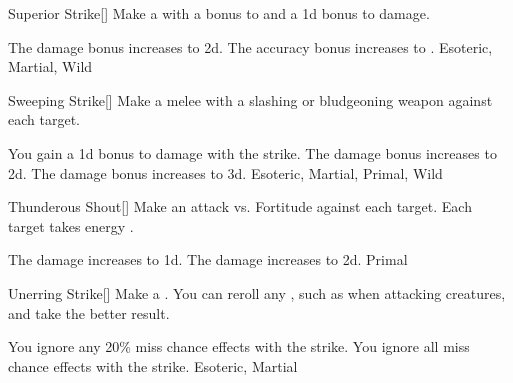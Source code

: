 \lowercase{\hypertarget{maneuver:Superior Strike}{}}\label{maneuver:Superior Strike}
\hypertarget{maneuver:Superior Strike}{}
\begin{freeability}[Rank 4]{Superior Strike}[]
Make a  with a  bonus to  and a \plus1d bonus to damage.

\rankline
{} The damage bonus increases to \plus2d.
 The accuracy bonus increases to .
 Esoteric, Martial, Wild
\end{freeability}
\vspace{0.25em}



\lowercase{\hypertarget{maneuver:Sweeping Strike}{}}\label{maneuver:Sweeping Strike}
\hypertarget{maneuver:Sweeping Strike}{}
\begin{freeability}[Rank 1]{Sweeping Strike}[]
Make a melee  with a slashing or bludgeoning weapon against each target.

\rankline
{} You gain a \plus1d bonus to damage with the strike.
 The damage bonus increases to \plus2d.
 The damage bonus increases to \plus3d.
 Esoteric, Martial, Primal, Wild
\end{freeability}
\vspace{0.25em}



\lowercase{\hypertarget{maneuver:Thunderous Shout}{}}\label{maneuver:Thunderous Shout}
\hypertarget{maneuver:Thunderous Shout}{}
\begin{freeability}[Rank 3]{Thunderous Shout}[]
Make an attack vs. Fortitude against each target.
\hit Each target takes energy .

\rankline
{} The damage increases to  \plus1d.
 The damage increases to  \plus2d.
 Primal
\end{freeability}
\vspace{0.25em}



\lowercase{\hypertarget{maneuver:Unerring Strike}{}}\label{maneuver:Unerring Strike}
\hypertarget{maneuver:Unerring Strike}{}
\begin{freeability}[Rank 3]{Unerring Strike}[]
Make a .
You can reroll any , such as when attacking  creatures, and take the better result.

\rankline
{} You ignore any 20\% miss chance effects with the strike.
 You ignore all miss chance effects with the strike.
 Esoteric, Martial
\end{freeability}
\vspace{0.25em}




